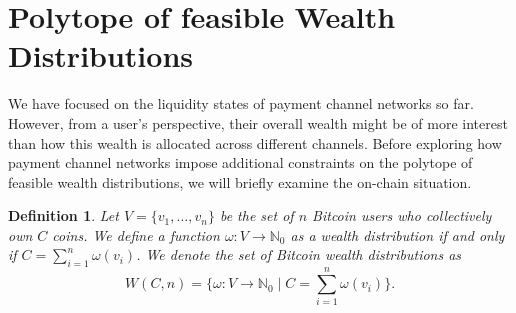 \documentclass[10pt,twocolumn]{article}
\newtheorem{definition}{Definition}[section]
\begin{document}
\section{Polytope of feasible Wealth Distributions}


We have focused on the liquidity states of payment channel networks so far. However, from a user's perspective, their overall wealth might be of more interest than how this wealth is allocated across different channels. Before exploring how payment channel networks impose additional constraints on the polytope of feasible wealth distributions, we will briefly examine the on-chain situation.

\begin{definition}
Let \( V = \{v_1, \dots, v_n\} \) be the set of \( n \) Bitcoin users who collectively own \( C \) coins. We define a function \( \omega: V \longrightarrow \mathbb{N}_0 \) as a wealth distribution if and only if \( C = \sum_{i=1}^n \omega(v_i) \). We denote the set of Bitcoin wealth distributions as
$$
W(C,n) = \{\omega: V \longrightarrow \mathbb{N}_0 \mid C = \sum_{i=1}^n \omega(v_i)\}.
$$
\end{definition}
\end{document}
